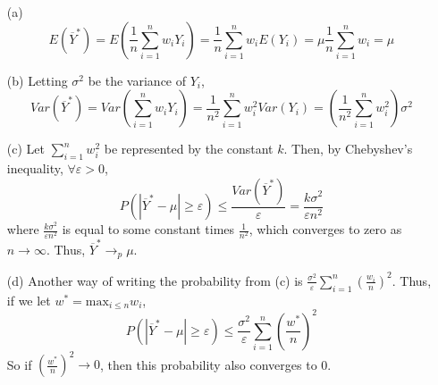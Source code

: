 \documentclass{article}
\newcommand{\est}[1]{\frac{1}{#1}\sum_{i=1}^{#1}}
\begin{document}
\begin{itemize}
	\item[(a)] 
		\[
			E(\overline{Y}^*) = E(\est{n}w_iY_i) = \est{n}w_iE(Y_i) = \mu\est{n}w_i = \mu
		\]
	\item[(b)] Letting $\sigma^2$ be the variance of $Y_i$,
		\[
			Var(\overline{Y}^*) = Var\left(\sum_{i=1}^nw_iY_i\right) = \frac{1}{n^2}\sum_{i=1}^nw_i^2Var(Y_i) = \left(\frac{1}{n^2}\sum_{i=1}^n w_i^2\right)\sigma^2
		\]
	
	\item[(c)] Let $\sum_{i=1}^n w_i^2$ be represented by the constant $k$. Then, by Chebyshev's inequality, $\forall\varepsilon>0$,
		\[
			P(|\overline{Y}^*-\mu|\geq\varepsilon)\leq \frac{Var(\overline{Y}^*)}{\varepsilon} = \frac{k\sigma^2}{\varepsilon n^2}
		\]
		where $\frac{k\sigma^2}{\varepsilon n^2}$ is equal to some constant times $\frac{1}{n^2}$, which converges to zero as $n\rightarrow\infty$. Thus, ${\overline{Y}^*\rightarrow_p\mu}$.
		
	\item[(d)] Another way of writing the probability from (c) is $\frac{\sigma^2}{\varepsilon}\sum_{i=1}^n\left(\frac{w_i}{n}\right)^2$. Thus, if we let ${w^*=\text{max}_{i\leq n}w_i}$,
		\[
			P(|\overline{Y}^*-\mu|\geq\varepsilon)\leq \frac{\sigma^2}{\varepsilon}\sum_{i=1}^n\left(\frac{w^*}{n}\right)^2
		\]
		So if $\left(\frac{w^*}{n}\right)^2\rightarrow 0$, then this probability also converges to 0.
	
	
\end{itemize}


\end{document}
